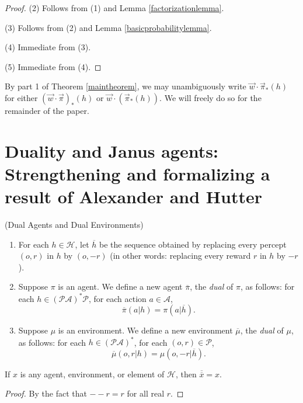 \documentclass[runningheads]{llncs}
\begin{document}
\begin{proof}
    (2) Follows from (1) and Lemma \ref{factorizationlemma}.

    (3) Follows from (2) and Lemma \ref{basicprobabilitylemma}.

    (4) Immediate from (3).

    (5) Immediate from (4).
\end{proof}

By part 1 of Theorem \ref{maintheorem},
we may unambiguously write $\vec w\cdot \vec\pi_*(h)$
for either $(\vec w\cdot\vec\pi)_*(h)$ or $\vec w\cdot(\vec\pi_*(h))$.
We will freely do so for the remainder of the paper.

\section{Duality and Janus agents:
Strengthening and formalizing a result of Alexander and Hutter}

\begin{definition}
\label{dualagentsdefn}
(Dual Agents and Dual Environments)
\begin{enumerate}
    \item
    For each $h\in\mathcal H$, let $\overline h$ be the sequence obtained
    by replacing every percept $(o,r)$ in $h$ by $(o,-r)$ (in other words:
    replacing every reward $r$ in $h$ by $-r$).
    \item
    Suppose $\pi$ is an agent.
    We define a new agent $\overline \pi$, the \emph{dual} of $\pi$,
    as follows:
    for each $h\in (\mathcal P\mathcal A)^*\mathcal P$,
    for each action $a\in\mathcal A$,
    \[\overline\pi(a|h)=\pi(a|\overline h).\]
    \item
    Suppose $\mu$ is an environment.
    We define a new environment $\overline\mu$, the \emph{dual} of $\mu$,
    as follows:
    for each $h\in (\mathcal P\mathcal A)^*$,
    for each $(o,r)\in\mathcal P$,
    \[\overline\mu(o,r|h)=\mu(o,-r|\overline h).\]
\end{enumerate}
\end{definition}

\begin{lemma}
\label{doublenegationlemma}
    If $x$ is any agent, environment, or element of $\mathcal H$,
    then $\overline{\overline x}=x$.
\end{lemma}

\begin{proof}
    By the fact that $--r=r$ for all real $r$.
\end{proof}
\end{document}

